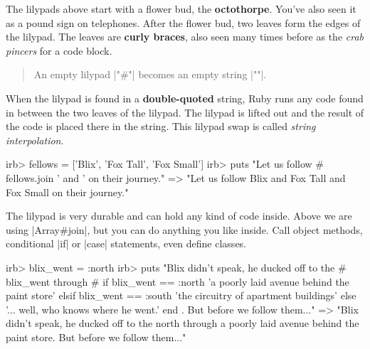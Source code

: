 \documentclass[12pt,twoside]{report}
\begin{document}
The lilypads above start with a flower bud, the {\bf octothorpe}.
You've also seen it as a pound sign on telephones.  After the flower
bud, two leaves form the edges of the lilypad.  The leaves are {\bf
  curly braces}, also seen many times before as the {\em crab pincers}
for a code block.

\begin{quote}
An empty lilypad \rubyinline|"#{}"| becomes an empty
string \rubyinline|""|.\end{quote}


When the lilypad is found in a {\bf double-quoted} string, Ruby runs
any code found in between the two leaves of the lilypad.  The lilypad
is lifted out and the result of the code is placed there in the
string.  This lilypad swap is called {\em string interpolation}.


\begin{consolecode}

 irb> fellows = ['Blix', 'Fox Tall', 'Fox Small']
 irb> puts "Let us follow #{ fellows.join ' and ' } on their journey."
   => "Let us follow Blix and Fox Tall and Fox Small on their journey."

\end{consolecode}


The lilypad is very durable and can hold any kind of code inside.
Above we are using \rubyinline|Array#join|, but you
can do anything you like inside.  Call object methods, conditional
\rubyinline|if| or \rubyinline|case|
statements, even define classes.


\begin{consolecode}

 irb> blix_went = :north
 irb> puts "Blix didn't speak, he ducked off to the #{ blix_went } through #{
             if blix_went == :north
               'a poorly laid avenue behind the paint store'
             elsif blix_went == :south
               'the circuitry of apartment buildings'
             else
               '... well, who knows where he went.'
             end }.  But before we follow them..."
 => "Blix didn't speak, he ducked off to the north through a poorly laid avenue
     behind the paint store.  But before we follow them..."

\end{consolecode}
\end{document}
